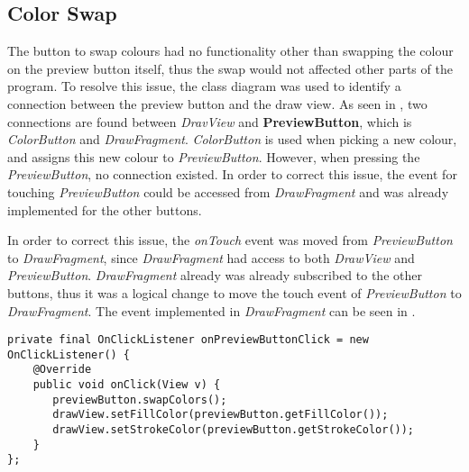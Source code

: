 \subsection{Color Swap}
The button to swap colours had no functionality other than swapping the colour on the preview button itself, thus the swap would not affected other parts of the program.
To resolve this issue, the class diagram was used to identify a connection between the preview button and the draw view.
As seen in , two connections are found between \textit{DravView} and \textbf{PreviewButton}, which is \textit{ColorButton} and \textit{DrawFragment}.
\textit{ColorButton} is used when picking a new colour, and assigns this new colour to \textit{PreviewButton}.
However, when pressing the \textit{PreviewButton}, no connection existed.
In order to correct this issue, the event for touching \textit{PreviewButton} could be accessed from \textit{DrawFragment} and was already implemented for the other buttons. 

In order to correct this issue, the \textit{onTouch} event was moved from \textit{PreviewButton} to \textit{DrawFragment}, since \textit{DrawFragment} had access to both \textit{DrawView} and \textit{PreviewButton}.
\textit{DrawFragment} already was already subscribed to the other buttons, thus it was a logical change to move the touch event of \textit{PreviewButton} to \textit{DrawFragment}.
The event implemented in \textit{DrawFragment} can be seen in .

\begin{lstlisting}[caption={onPreviewButtonClick event},label=lst:event-previewbuttonclick]
private final OnClickListener onPreviewButtonClick = new OnClickListener() {
    @Override
    public void onClick(View v) {
       previewButton.swapColors();
       drawView.setFillColor(previewButton.getFillColor());
       drawView.setStrokeColor(previewButton.getStrokeColor());
    }
};
\end{lstlisting}
